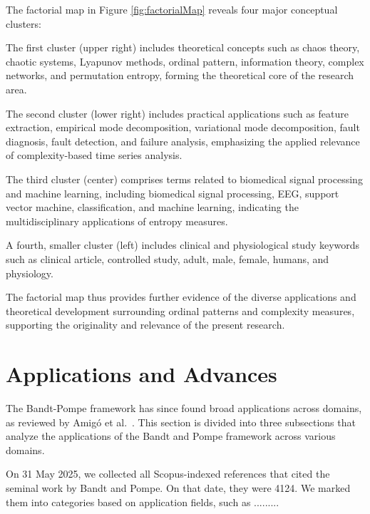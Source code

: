 The factorial map in Figure \ref{fig:factorialMap} reveals four major conceptual clusters:

The first cluster (upper right) includes theoretical concepts such as chaos theory, chaotic systems, Lyapunov methods, ordinal pattern, information theory, complex networks, and permutation entropy, forming the theoretical core of the research area.

The second cluster (lower right) includes practical applications such as feature extraction, empirical mode decomposition, variational mode decomposition, fault diagnosis, fault detection, and failure analysis, emphasizing the applied relevance of complexity-based time series analysis.

The third cluster (center) comprises terms related to biomedical signal processing and machine learning, including biomedical signal processing, EEG, support vector machine, classification, and machine learning, indicating the multidisciplinary applications of entropy measures.

A fourth, smaller cluster (left) includes clinical and physiological study keywords such as clinical article, controlled study, adult, male, female, humans, and physiology.

The factorial map thus provides further evidence of the diverse applications and theoretical development surrounding ordinal patterns and complexity measures, supporting the originality and relevance of the present research.

\section{Applications and Advances}


The Bandt-Pompe framework has since found broad applications across domains, as reviewed by Amigó et al.~\cite{amigo2023ordinal}. 
This section is divided into three subsections that analyze the applications of the Bandt and Pompe framework across various domains.

On 31 May 2025, we collected all Scopus-indexed references that cited the seminal work by Bandt and Pompe.
On that date, they were 4124.
We marked them into categories based on application fields, such as .........

